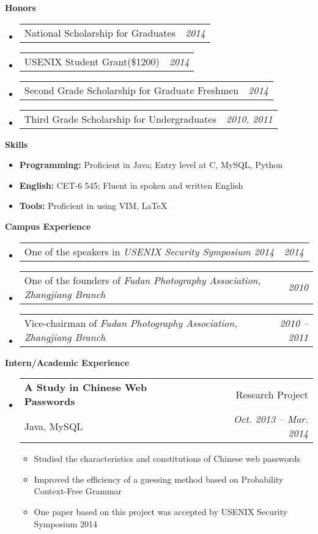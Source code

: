 \documentclass[letterpaper,10pt]{article}
\makeatletter
\newcommand{\resitem}[1]{\item #1 \vspace{-2pt}}
\newcommand{\resheading}[1]{{\large \colorbox{mygrey}{\begin{minipage}{\textwidth}{\textbf{#1 \vphantom{p\^{E}}}}\end{minipage}}}}
\newcommand{\ressubheading}[4]{
\begin{tabular*}{6.5in}{l@{\extracolsep{\fill}}r}
		\textbf{#1} & #2 \\
		#3 & #4 \\
\end{tabular*}\vspace{-6pt}}
\newcommand{\cvitem}[2]{
\begin{tabular*}{6.5in}{l@{\extracolsep{\fill}}r}
		#1 & #2 \\
\end{tabular*}\vspace{-1pt}}
\makeatother
\begin{document}
\resheading{Honors}
	\begin{itemize}
		\item \cvitem{National Scholarship for Graduates}{\emph{2014}}
		\item \cvitem{USENIX Student Grant(\$1200)}{\emph{2014}}
		\item \cvitem{Second Grade Scholarship for Graduate Freshmen}{\emph{2014}}
		\item \cvitem{Third Grade Scholarship for Undergraduates}{\emph{2010, 2011}}
	\end{itemize}

\resheading{Skills}
	\begin{itemize}
		\item
            \textbf{Programming:} Proficient in Java; Entry level at C, MySQL, Python
        \item    
            \textbf{English:} CET-6 545; Fluent in spoken and written English
        \item   
            \textbf{Tools:} Proficient in using VIM, \LaTeX 
	\end{itemize} %

\resheading{Campus Experience}
	\begin{itemize}
		\item \cvitem{One of the speakers in \emph{USENIX Security Symposium 2014}}{\emph{2014}}
		\item \cvitem{One of the founders of \emph{Fudan Photography Association, Zhangjiang Branch}}{\emph{2010}}
		\item \cvitem{Vice-chairman of \emph{Fudan Photography Association, Zhangjiang Branch}}{\emph{2010 -- 2011}}
	\end{itemize}


\resheading{Intern/Academic Experience}
	\begin{itemize}
		\item
			\ressubheading{A Study in Chinese Web Passwords}{Research Project}{Java, MySQL}{\emph{Oct. 2013 -- Mar. 2014}}
			{\begin{itemize}
				\resitem{Studied the characteristics and constitutions of Chinese web passwords}
                \resitem{Improved the efficiency of a guessing method based on Probability Context-Free Grammar}
				\resitem{One paper based on this project was accepted by USENIX Security Symposium 2014}
			\end{itemize}}
	\end{itemize}
			
\end{document}
